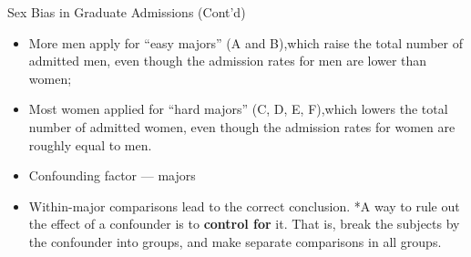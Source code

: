 \documentclass[
  ignorenonframetext,
]{beamer}
\providecommand{\tightlist}{%
  \setlength{\itemsep}{0pt}\setlength{\parskip}{0pt}}
\begin{document}
\begin{frame}{Sex Bias in Graduate Admissions (Cont'd)}
\protect\hypertarget{sex-bias-in-graduate-admissions-contd-1}{}
\begin{itemize}
\tightlist
\item
  More men apply for ``easy majors'' (A and B),\newline which raise the
  total number of admitted men, even though the admission rates for men
  are lower than women;
\item
  Most women applied for ``hard majors'' (C, D, E, F),\newline which
  lowers the total number of admitted women, even though the admission
  rates for women are roughly equal to men.
\item
  Confounding factor --- majors
\item
  Within-major comparisons lead to the correct conclusion. *A way to
  rule out the effect of a confounder is to \textbf{control for} it.
  That is, break the subjects by the confounder into groups, and make
  separate comparisons in all groups.
\end{itemize}
\end{frame}
\end{document}
